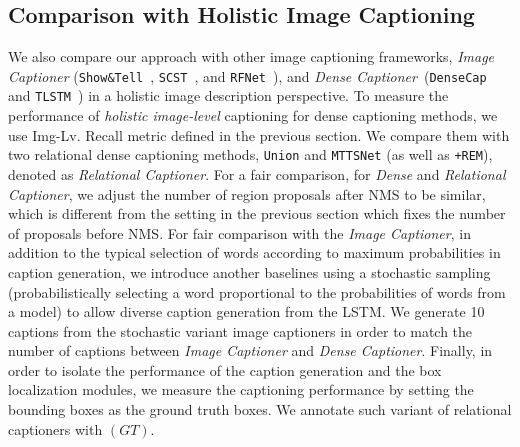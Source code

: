 \subsection{{Comparison with} Holistic Image Captioning}
We also compare our approach with other image captioning frameworks, \emph{Image Captioner} {(\texttt{Show\&Tell}~\cite{vinyals2015show}, \texttt{SCST}~\cite{rennie2017self}, and \texttt{RFNet}~\cite{jiang2018recurrent}}), and \emph{Dense Captioner}~(\texttt{DenseCap}~\cite{johnson2016densecap} {and \texttt{TLSTM}~\cite{Yang_2017_CVPR}}) in a holistic image description perspective.
To measure the performance of \emph{holistic image-level} captioning for dense captioning methods, we use Img-Lv. Recall metric {defined in the previous section}.
We compare them with two relational dense captioning methods, \texttt{Union} and \texttt{MTTSNet} ({as well as \texttt{+REM}}), denoted as \emph{Relational Captioner}.
For a fair comparison, for \emph{Dense} and \emph{Relational Captioner}, we adjust the number of region proposals after NMS to be similar, which is different from the setting in the previous section which fixes the number of proposals before NMS.
{For fair comparison with the \emph{Image Captioner}, in addition to  {the typical selection of words according to maximum probabilities in} 
caption generation,
we introduce another baselines using} a stochastic sampling (probabilistically selecting a word 
{proportional to}
{the probabilities of words} from a model) to 
{allow diverse caption generation from the LSTM.}
We generate 10 captions from {the stochastic variant image captioners} {in order to match the number of captions between \emph{Image Captioner} and \emph{Dense Captioner}}.
{Finally, in order to isolate the performance of the caption generation and the box localization modules, we measure the captioning performance by setting the bounding boxes as the ground truth boxes. 
We annotate such variant of relational captioners with $(GT)$.}









